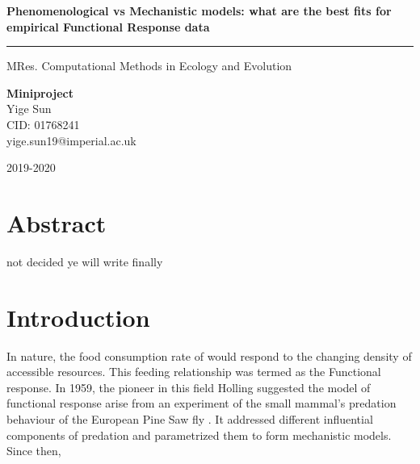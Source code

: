 \documentclass[11pt, a4paper]{article}
\begin{document}
 
	
	\begin{titlepage} 
		\centering 
		
		
		\vspace*{\baselineskip} 
		
		
		\vspace{0.75\baselineskip} %
		
		{\LARGE \textbf{Phenomenological vs Mechanistic models: what are the best fits for empirical Functional Response data}} %
		
		\vspace{0.1\baselineskip} %
		
		\rule{\textwidth}{1.6pt} %
		
		\vspace{1\baselineskip} %
		MRes. Computational Methods in Ecology and Evolution
		
		{\large \textbf{Miniproject}}\\ %
		\vspace*{2\baselineskip} %
		{\Large Yige Sun} \\%
		CID: 01768241\\
		yige.sun19@imperial.ac.uk
		
		\vfill %
		
		{\LARGE 2019-2020} 
		\vspace{1\baselineskip}
	\end{titlepage}

\linenumbers
\section{Abstract}
not decided ye will write finally

\section{Introduction}
In nature, the food consumption rate of would respond to the changing density of accessible resources. This feeding relationship was termed as the Functional response. In 1959, the pioneer in this field Holling suggested the model of functional response arise from an experiment of the small mammal's predation behaviour of the European Pine Saw fly \cite{Holling1959}. It addressed different influential components of predation and parametrized them to form mechanistic models. Since then,  
\end{document}

